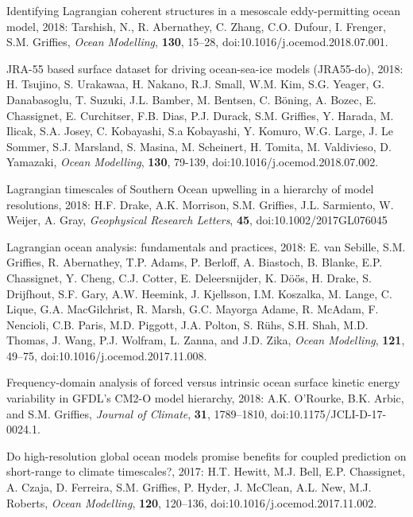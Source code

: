 \begin{etaremune}
\item Identifying Lagrangian coherent structures in a mesoscale eddy-permitting ocean model, 2018: Tarshish, N., R. Abernathey, C. Zhang, C.O. Dufour, I. Frenger, S.M. Grif\/f\/ies, \textit{Ocean Modelling}, {\bf 130}, 15--28, doi:10.1016/j.ocemod.2018.07.001.

\item JRA-55 based surface dataset for driving ocean-sea-ice models (JRA55-do), 2018: H. Tsujino, S. Urakawaa, H. Nakano, R.J. Small, W.M. Kim, S.G. Yeager, G. Danabasoglu, T. Suzuki, J.L. Bamber, M. Bentsen, C. {B\"{o}ning}, A. Bozec, E. Chassignet, E. Curchitser, F.B. Dias, P.J. Durack, S.M. Grif\/f\/ies, Y. Harada, M. Ilicak, S.A. Josey, C. Kobayashi, S.a Kobayashi, Y. Komuro, W.G. Large, J. {Le Sommer}, S.J. Marsland, S. Masina, M. Scheinert, H. Tomita, M. Valdivieso, D. Yamazaki, {\it Ocean Modelling},  {\bf 130}, 79-139, doi:10.1016/j.ocemod.2018.07.002.

\item Lagrangian timescales of Southern Ocean upwelling in a hierarchy of model resolutions, 2018: H.F. Drake, A.K. Morrison, S.M. Grif\/f\/ies, J.L. Sarmiento, W. Weijer, A. Gray, {\it  Geophysical Research Letters}, {\bf 45}, doi:10.1002/2017GL076045

\item  Lagrangian ocean analysis: fundamentals and practices, 2018: E. van Sebille, S.M. Grif\/f\/ies, R. Abernathey, T.P. Adams, P. Berloff, A. Biastoch, B. Blanke, E.P. Chassignet, Y. Cheng, C.J. Cotter, E. Deleersnijder, K. {D\"{o}\"{o}̈s}, H. Drake, S. Drijfhout, S.F. Gary, A.W. Heemink, J. Kjellsson, I.M. Koszalka, M. Lange, C. Lique, G.A.  MacGilchrist, R. Marsh, G.C. Mayorga Adame, R. McAdam, F. Nencioli, C.B. Paris, M.D. Piggott, J.A. Polton, S. {R\"{u}hs}, S.H. Shah, M.D. Thomas, J. Wang, P.J. Wolfram, L. Zanna, and J.D. Zika, {\it Ocean Modelling},
{\bf 121}, 49--75,  doi:10.1016/j.ocemod.2017.11.008.

\item Frequency-domain analysis of forced versus intrinsic ocean surface kinetic energy variability in GFDL's CM2-O model hierarchy, 2018: A.K. O'Rourke, B.K. Arbic, and S.M. Grif\/f\/ies, {\it Journal of Climate}, {\bf 31}, 1789--1810, doi:10.1175/JCLI-D-17-0024.1.

\item Do high-resolution global ocean models promise benefits for coupled prediction on short-range to climate timescales?, 2017: H.T. Hewitt, M.J. Bell, E.P. Chassignet, A. Czaja, D. Ferreira, S.M. Grif\/f\/ies, P. Hyder, J. McClean, A.L. New, M.J. Roberts, {\it Ocean Modelling}, {\bf 120}, 120--136, doi:10.1016/j.ocemod.2017.11.002.


\end{etaremune}
